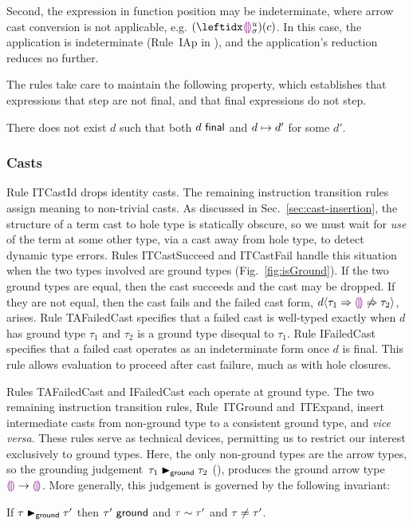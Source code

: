 Second, the expression in function position may be indeterminate,
where arrow cast conversion is not applicable,
e.g. $\hap{(\dehole{u}{\sigma}{})}{c}$.
%
In this case, the application is indeterminate (Rule~{IAp}
in ), and the application's reduction reduces no
further.

The rules take care to maintain the following property, which establishes that expressions that step are not final, and that final expressions do not step.%
%
\begin{thm}[Finality] There does not exist $d$ such that both $d~\mathsf{final}$ and $d \mapsto d'$ for some $d'$.
\end{thm}

\subsubsection{Casts}
Rule {ITCastId} drops identity casts. The remaining instruction
transition rules assign meaning to non-trivial casts.
%
As discussed in Sec.~\ref{sec:cast-insertion}, the structure of a term
cast to hole type is statically obscure,
%
so we must wait for \emph{use} of the term at some other type, via a
cast away from hole type, to detect dynamic type errors.
%
Rules {ITCastSucceed} and {ITCastFail} handle this situation when the
two types involved are ground types (Fig.~\ref{fig:isGround}).
%
If the two ground types are equal, then the cast succeeds and the cast
may be dropped.
%
If they are not equal, then the cast fails and the failed cast form,
$d \langle{\tau_1}\Rightarrow{\textcolor{violet}{\llparenthesis}\textcolor{violet}{\rrparenthesis}}\not\Rightarrow{\tau_2}\rangle$, arises.
%
Rule {TAFailedCast} specifies that a failed cast is well-typed exactly
when $d$ has ground type $\tau_1$ and $\tau_2$ is a ground type
disequal to $\tau_1$.
%
Rule {IFailedCast} specifies that a failed cast operates as an
indeterminate form once $d$ is final.
%
This rule allows evaluation to proceed after cast failure, much as
with hole closures.

Rules {TAFailedCast} and {IFailedCast} each operate at ground type. 
%
The two remaining instruction transition rules, Rule~{ITGround}
and~{ITExpand}, insert intermediate casts from non-ground type to a
consistent ground type, and \emph{vice versa}.
%
These rules serve as technical devices, permitting us to restrict our
interest exclusively to ground types.
%
Here, the only non-ground types are the arrow types, so the grounding
judgement~$\tau_1 \blacktriangleright_{\mathsf{ground}} \tau_2$ (),
produces the ground arrow type~$\textcolor{violet}{\llparenthesis}\textcolor{violet}{\rrparenthesis} \rightarrow \textcolor{violet}{\llparenthesis}\textcolor{violet}{\rrparenthesis}$.
%
More generally, this judgement is governed by the following invariant:
\begin{lem}[Grounding] 
  If $\tau \blacktriangleright_{\mathsf{ground}} \tau'$
  then $\tau'~\mathsf{ground}$
  and $\tau \sim \tau'$
  and $\tau\neq\tau'$.
\end{lem}

